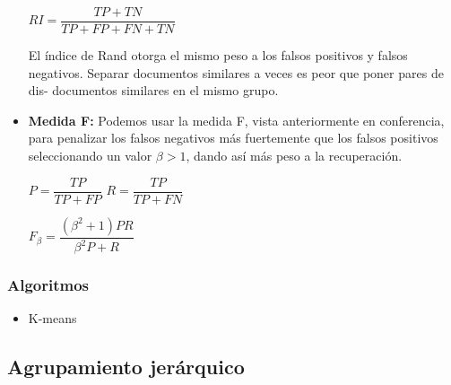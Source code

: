 \documentclass{llncs}
\begin{document}
\begin{itemize}
	\begin{center}
		$ RI = \dfrac{TP + TN}{TP + FP + FN + TN} $
	\end{center}

	El índice de Rand otorga el mismo peso a los falsos positivos y falsos negativos.
	Separar documentos similares a veces es peor que poner pares de dis-
	documentos similares en el mismo grupo.
	
	\vspace{1em}
	\item \textbf{Medida F:} Podemos usar la medida F, vista anteriormente en conferencia, para penalizar los falsos negativos más fuertemente que los falsos positivos seleccionando un valor $ \beta > 1 $, dando así más peso a la recuperación.
	\begin{center}
	$ P = \dfrac{TP}{TP + FP}  $ \hspace{2em}
	$ R = \dfrac{TP}{TP + FN} $
	
	\vspace{1em}
	$ F_{\beta} = \dfrac{(\beta^{2} + 1)PR}{\beta^{2}P + R} $
	\end{center}
\end{itemize}

\subsubsection{Algoritmos}
\begin{itemize}
	\item K-means
\end{itemize}


\subsection{Agrupamiento jer\'arquico}
\end{document}
